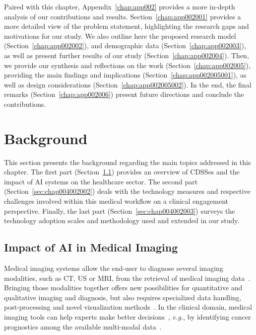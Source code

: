 Paired with this chapter, Appendix~\ref{chap:app002} provides a more in-depth analysis of our contributions and results.
Section~\ref{chap:app002001} provides a more detailed view of the problem statement, highlighting the research gaps and motivations for our study.
We also outline here the proposed research model (Section~\ref{chap:app002002}), and demographic data (Section~\ref{chap:app002003}), as well as present further results of our study (Section~\ref{chap:app002004}).
Then, we provide our synthesis and reflections on the work (Section~\ref{chap:app002005}), providing the main findings and implications (Section~\ref{chap:app002005001}), as well as design considerations (Section~\ref{chap:app002005002}).
In the end, the final remarks (Section~\ref{chap:app002006}) present future directions and conclude the contributions.

\section{Background}
\label{sec:chap004002}

This section presents the background regarding the main topics addressed in this chapter.
The first part (Section~\ref{sec:chap004002001}) provides an overview of \acp{CDSSe} and the impact of \ac{AI} systems on the healthcare sector.
The second part (Section~\ref{sec:chap004002002}) deals with the technology measures and respective challenges involved within this medical workflow on a clinical engagement perspective.
Finally, the last part (Section~\ref{sec:chap004002003}) surveys the technology adoption scales and methodology used and extended in our study.

\subsection{Impact of AI in Medical Imaging}
\label{sec:chap004002001}

Medical imaging systems allow the end-user to diagnose several imaging modalities, such as \ac{CT}, \ac{US} or \ac{MRI}, from the retrieval of medical imaging data~\cite{seifabadi2019correlation}.
Bringing those modalities together offers new possibilities for quantitative and qualitative imaging and diagnosis, but also requires specialized data handling, post-processing and novel visualization methods~\cite{Ocegueda-Hernandez:2016:CMN:2876456.2879485}.
In the clinical domain, medical imaging tools can help experts make better decisions~\cite{Lopes:2017:UHC:3143820.3144118}, {\it e.g.}, by identifying cancer prognostics among the available multi-modal data~\cite{lopes2018interaction}.


